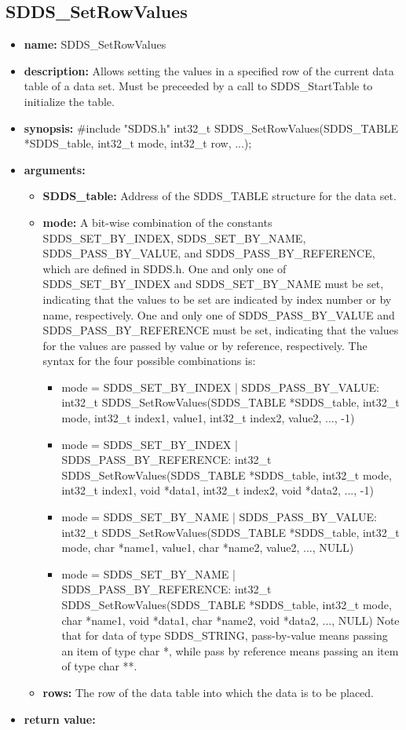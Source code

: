 \documentclass[11pt]{article}
\begin{document}
\subsection{SDDS\_SetRowValues}
\label{SDDS_SetRowValues}

\begin{itemize}
\item {\bf name:}\newline
SDDS\_SetRowValues
\item {\bf description:}\newline
Allows setting the values in a specified row of the current data table of a data set. Must be preceeded by a call to SDDS\_StartTable to initialize the table.
\item {\bf synopsis:} \#include "SDDS.h"\newline
int32\_t SDDS\_SetRowValues(SDDS\_TABLE *SDDS\_table, int32\_t mode, int32\_t row, ...);
\item {\bf arguments:}
\begin{itemize}
\item {\bf SDDS\_table:} Address of the SDDS\_TABLE structure for the data set.
\item {\bf mode:} A bit-wise combination of the constants SDDS\_SET\_BY\_INDEX, SDDS\_SET\_BY\_NAME, SDDS\_PASS\_BY\_VALUE, and SDDS\_PASS\_BY\_REFERENCE, which are defined in  SDDS.h. One and only one of SDDS\_SET\_BY\_INDEX and SDDS\_SET\_BY\_NAME must be set, indicating that the values to be set are indicated by index number or by name, respectively. One and only one of SDDS\_PASS\_BY\_VALUE and SDDS\_PASS\_BY\_REFERENCE must be set, indicating that the values for the values are passed by value or by reference, respectively. The syntax for the four possible combinations is:
\begin{itemize}
\item mode = SDDS\_SET\_BY\_INDEX | SDDS\_PASS\_BY\_VALUE: int32\_t SDDS\_SetRowValues(SDDS\_TABLE *SDDS\_table, int32\_t mode, int32\_t index1,  value1, int32\_t index2,  value2, ..., -1)
\item mode = SDDS\_SET\_BY\_INDEX | SDDS\_PASS\_BY\_REFERENCE: int32\_t SDDS\_SetRowValues(SDDS\_TABLE *SDDS\_table, int32\_t mode, int32\_t index1, void *data1, int32\_t index2, void *data2, ..., -1)
\item mode = SDDS\_SET\_BY\_NAME | SDDS\_PASS\_BY\_VALUE: int32\_t SDDS\_SetRowValues(SDDS\_TABLE *SDDS\_table, int32\_t mode, char *name1,  value1, char *name2,  value2, ..., NULL)
\item mode = SDDS\_SET\_BY\_NAME | SDDS\_PASS\_BY\_REFERENCE: int32\_t SDDS\_SetRowValues(SDDS\_TABLE *SDDS\_table, int32\_t mode, char *name1, void *data1, char *name2, void *data2, ..., NULL) Note that for data of type SDDS\_STRING, pass-by-value means passing an item of type char *, while pass by reference means passing an item of type char **.
\end{itemize}
\item {\bf rows:} The row of the data table into which the data is to be placed.
\end{itemize}
\item {\bf return value:}\newline


\end{itemize}
\end{document}
